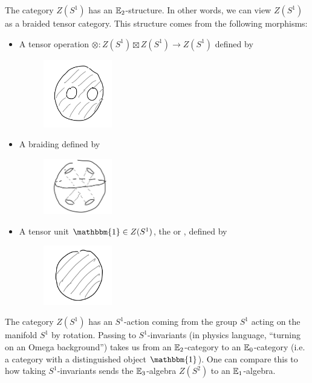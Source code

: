 The category $Z(S^1)$ has an $\mathbb{E}_2$-structure.
In other words, we can view $Z(S^1)$ as a braided tensor category.
This structure comes from the following morphisms:%
\begin{itemize}
    \item A tensor operation $\otimes: Z(S^1) \boxtimes Z(S^1) \to Z(S^1)$ defined by
    \begin{figure}[htp]
    \centering
    \includegraphics[width=3cm]{frilec1graphics/mult.png}
\end{figure}
    \item A braiding defined by
    \begin{figure}[htp]
    \centering
    \includegraphics[width=3cm]{frilec1graphics/braiding.png}
\end{figure}
    \item A tensor unit $\mathbbm{1} \in Z(S^1)$, the  or , defined by
    \begin{figure}[htp]
    \centering
    \includegraphics[width=3cm]{frilec1graphics/unit.png}
\end{figure}
\end{itemize}

The category $Z(S^1)$ has an $S^1$-action coming from the group $S^1$ acting on the manifold $S^1$ by rotation.
Passing to $S^1$-invariants (in physics language, ``turning on an Omega background'') takes us from an $\mathbb{E}_2$-category to an $\mathbb{E}_0$-category (i.e. a category with a distinguished object $\mathbbm{1}$).
One can compare this to how taking $S^1$-invariants sends the $\mathbb{E}_3$-algebra $Z(S^2)$ to an $\mathbb{E}_1$-algebra.

